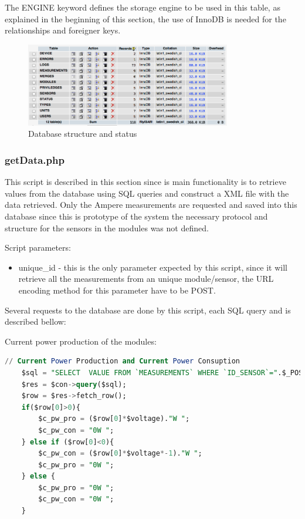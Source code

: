 The ENGINE keyword defines the storage engine to be used in this table, as explained in the beginning of this section, the use of InnoDB is needed for the relationships and foreigner keys.

%
\begin{figure}[H]
		\begin{centering}
			\includegraphics[width=0.8\textwidth]{images/db_struct.png}
			\caption{Database structure and status}
		\end{centering}
\end{figure}


\subsubsection{getData.php} This script is described in this section since is main functionality is to retrieve values from the database using SQL queries and construct a XML file with the data retrieved. Only the Ampere measurements are requested and saved into this database since this is prototype of the system the necessary protocol and structure for the sensors in the modules was not defined.

Script parameters:
\begin{itemize}
	\item unique\_id - this is the only parameter expected by this script, since it will retrieve all the measurements from an unique module/sensor, the URL encoding method for this parameter have to be POST.
\end{itemize}

Several requests to the database are done by this script, each SQL query and is described bellow:

Current power production of the modules:
\begin{lstlisting}[language=sql]
// Current Power Production and Current Power Consuption
	$sql = "SELECT  VALUE FROM `MEASUREMENTS` WHERE `ID_SENSOR`=".$_POST['unique_id']." ORDER BY ID_MEASURE DESC LIMIT 1";
	$res = $con->query($sql);
	$row = $res->fetch_row();
	if($row[0]>0){
		$c_pw_pro = ($row[0]*$voltage)."W ";
		$c_pw_con = "0W ";
	} else if ($row[0]<0){
		$c_pw_con = ($row[0]*$voltage*-1)."W ";
		$c_pw_pro = "0W ";
	} else {
		$c_pw_pro = "0W ";
		$c_pw_con = "0W ";
	}
\end{lstlisting}


